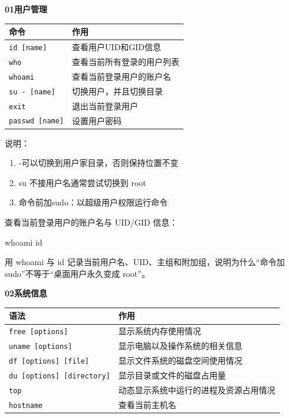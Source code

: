 \textbf{01用户管理}
\begin{table}[!htbp]
	\centering
	\begin{tabular}{p{}p{}}
		\toprule[1.5pt]
		命令 & 作用\\
		\midrule[1pt]
		\texttt{id   [name]}			&查看用户UID和GID信息\\
		\texttt{who}			&查看当前所有登录的用户列表\\
		\texttt{whoami}			&查看当前登录用户的账户名\\
		\texttt{su   -   [name]}			&切换用户，并且切换目录\\
		\texttt{exit}			&退出当前登录用户\\
		\texttt{passwd  [name]}			&设置用户密码\\
		\bottomrule[1.5pt]
	\end{tabular}
\end{table}

说明：
\begin{enumerate}
	\item -\enspace 可以切换到用户家目录，否则保持位置不变
	\item su 不接用户名通常尝试切换到 root
	\item 命令前加sudo：以超级用户权限运行命令
\end{enumerate}

\begin{example}
查看当前登录用户的账户名与 UID/GID 信息：


\begin{tbash}
whoami
id
\end{tbash}


\end{example}

\begin{exercise}\label{ex:v1-user-info}
用 whoami 与 id 记录当前用户名、UID、主组和附加组，说明为什么“命令加 sudo”不等于“桌面用户永久变成 root”。
\end{exercise}
\textbf{02系统信息}

\begin{table}[!htbp]
	\centering
	\begin{tabular}{p{}p{}}
		\toprule[1.5pt]
		语法 & 作用\\
		\midrule[1pt]
		\texttt{free  [options]}			&显示系统内存使用情况\\
		\texttt{uname  [options]}			&显示电脑以及操作系统的相关信息\\
		\texttt{df  [options]  [file]}			&显示文件系统的磁盘空间使用情况\\
		\texttt{du  [options]  [directory]}			&显示目录或文件的磁盘占用量\\
		\texttt{top}			&动态显示系统中运行的进程及资源占用情况\\
		\texttt{hostname}			&查看当前主机名\\
		\bottomrule[1.5pt]
	\end{tabular}
\end{table}


